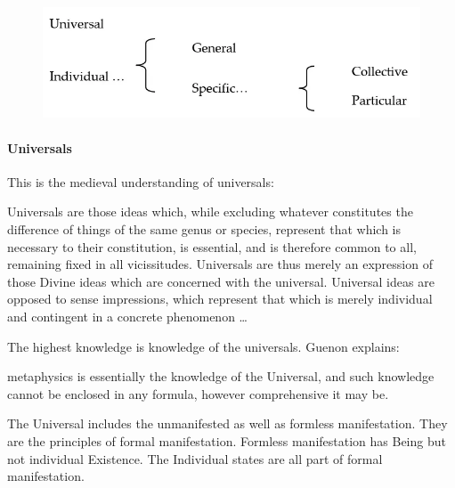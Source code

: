\begin{figure}[t]
\centering
 \includegraphics[scale=0.25]{a20220922SacredScience102TheSelfandtheEgo-img001.png} 
\end{figure}

\paragraph{Universals}
This is the medieval understanding of universals:

\begin{quotex}
Universals are those ideas which, while excluding whatever constitutes the difference of things of the same genus or species, represent that which is necessary to their constitution, is essential, and is therefore common to all, remaining fixed in all vicissitudes. Universals are thus merely an expression of those Divine ideas which are concerned with the universal. Universal ideas are opposed to sense impressions, which represent that which is merely individual and contingent in a concrete phenomenon …

\end{quotex}
The highest knowledge is knowledge of the universals. Guenon explains:

\begin{quotex}
metaphysics is essentially the knowledge of the Universal, and such knowledge cannot be enclosed in any formula, however comprehensive it may be.

\end{quotex}
The Universal includes the unmanifested as well as formless manifestation. They are the principles of formal manifestation. Formless manifestation has Being but not individual Existence. The Individual states are all part of formal manifestation.

